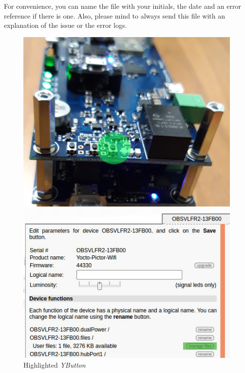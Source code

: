 For convenience, you can name the file with your initials, the date and
an error reference if there is one. Also, please mind to always send this 
file with an explanation of the issue or the error logs.

\begin{figure}[H]
  \centering
  \begin{minipage}[b]{0.40\textwidth}
	  \includegraphics[scale=.09]{images/yoctopuce_bug1.jpg}
	  \caption{Highlighted \emph{YButton}}
	  \label{fig:ybutton}
  \end{minipage}
  \hfill
	\vspace{15pt}
  \begin{minipage}[b]{0.50\textwidth}
	  \includegraphics[scale=.54]{images/yoctopuce_bug2.jpg}

\end{minipage}
\end{figure}
